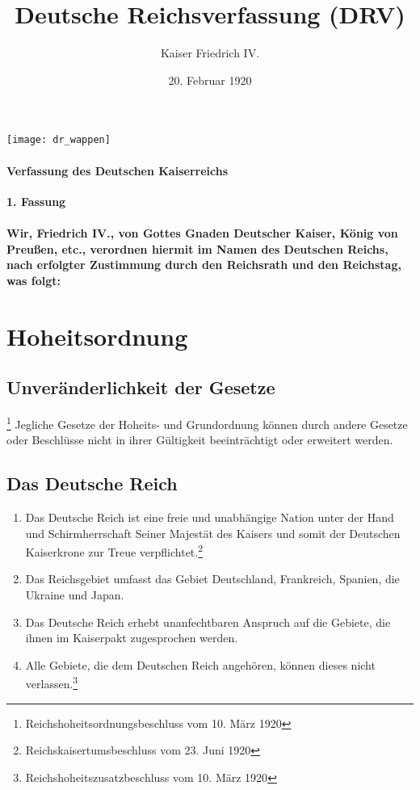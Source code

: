 \documentclass{article}
\title{Deutsche Reichsverfassung (DRV)}
\author{Kaiser Friedrich IV.}
\date{20. Februar 1920}
\newenvironment*{pg}{\begin{enumerate}[(1)]}{\end{enumerate}}
\begin{document}
\maketitle
\begin{center}
    \texttt{[image: dr\_wappen]}
\end{center}
\vspace*{\fill}
\paragraph{Verfassung des Deutschen Kaiserreichs}

\newpage
{}
\vspace*{\fill}
\begin{Center}
\textbf{1. Fassung}
\vspace*{\fill}
\end{Center}
\newpage
{}
\vspace*{\fill}
\paragraph*{Wir, Friedrich IV., von Gottes Gnaden Deutscher Kaiser, König von Preußen, etc., verordnen
hiermit im Namen des Deutschen Reichs, nach erfolgter Zustimmung durch den Reichsrath und den Reichstag,
was folgt:}
\vspace*{\fill}
\newpage
\tableofcontents
\newpage
\section{Hoheitsordnung}
\subsection{Unveränderlichkeit der Gesetze}\footnote{Reichshoheitsordnungsbeschluss vom 10. März 1920}
Jegliche Gesetze der Hoheits- und Grundordnung können durch andere Gesetze oder Beschlüsse nicht in ihrer Gültigkeit beeinträchtigt oder erweitert werden.

\subsection{Das Deutsche Reich}
\begin{pg}
    \item Das Deutsche Reich ist eine freie und unabhängige Nation unter der Hand und Schirmherrschaft Seiner Majestät des Kaisers und somit der Deutschen Kaiserkrone zur Treue verpflichtet.\footnote{Reichskaisertumsbeschluss vom 23. Juni 1920}
    \item Das Reichsgebiet umfasst das Gebiet Deutschland, Frankreich, Spanien, die Ukraine und Japan.
    \item Das Deutsche Reich erhebt unanfechtbaren Anspruch auf die Gebiete, die ihnen im Kaiserpakt zugesprochen werden.
    \item Alle Gebiete, die dem Deutschen Reich angehören, können dieses nicht verlassen.\footnote{Reichshoheitszusatzbeschluss vom 10. März 1920}
\end{pg}
\end{document}
